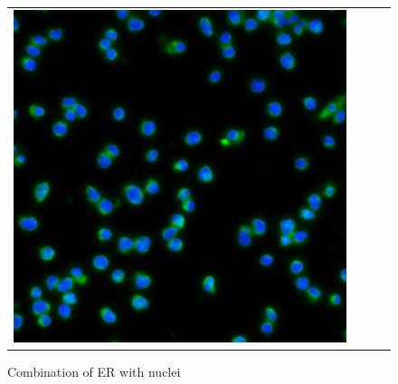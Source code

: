 \begin{figure}[htb]
\begin{tabularx}{\textwidth}{YYYY}
            \includegraphics{bilder/ER/gt_nuclei.jpg}
        \end{tabularx}
    \caption{Combination of ER with nuclei}
    \label{fig:er-combined}
\end{figure}
